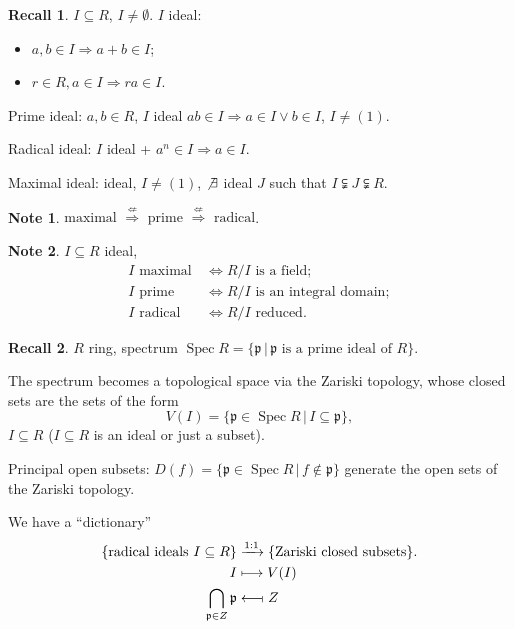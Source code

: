 \documentclass[12pt]{article}
\DeclareMathOperator{\Spec}{Spec}
\theoremstyle{definition}
\newtheorem*{note}{Note}
\newtheorem*{recall}{Recall}
\begin{document}
\begin{recall}
$I\subseteq R$, $I\neq\emptyset$. $I$ ideal:
\begin{itemize}
\item $a,b\in I\Rightarrow a+b\in I$;
\item $r\in R,a\in I\Rightarrow ra\in I$.
\end{itemize}

Prime ideal: $a,b\in R$, $I$ ideal $ab\in I\Rightarrow a\in I\vee b\in I$, $I\neq(1)$.

Radical ideal: $I$ ideal + $a^n\in I\Rightarrow a\in I$.

Maximal ideal: ideal, $I\neq(1)$, $\not\exists$ ideal $J$ such that $I\subsetneqq J\subsetneqq R$.
\end{recall}

\begin{note}
$\text{maximal }\overset{\not\Leftarrow}{\Rightarrow}\text{ prime }\overset{\not\Leftarrow}{\Rightarrow}\text{ radical}$.
\end{note}

\begin{note}
$I\subseteq R$ ideal,
\begin{align*}
I\text{ maximal}\,&\Longleftrightarrow R/I\text{ is a field};\\
I\text{ prime}\,&\Longleftrightarrow R/I\text{ is an integral domain};\\
I\text{ radical}\,&\Longleftrightarrow R/I\text{ reduced}.
\end{align*}
\end{note}

\begin{recall}
$R$ ring, spectrum $\Spec R=\{\mathfrak{p}\,|\,\mathfrak{p}\text{ is a prime ideal of }R\}$.
\end{recall}

The spectrum becomes a topological space via the Zariski topology, whose closed sets are the sets of the form
\[V(I)=\{\mathfrak{p}\in\Spec R\,|\,I\subseteq\mathfrak{p}\},\]
$I\subseteq R$ ($I\subseteq R$ is an ideal or just a subset).

Principal open subsets: $D(f)=\{\mathfrak{p}\in\Spec R\,|\,f\notin\mathfrak{p}\}$ generate the open sets of the Zariski topology.

We have a ``dictionary''
\begin{align*}
\{\text{radical ideals }I\subseteq R\}&\xrightarrow{1:1}\{\text{Zariski closed subsets}\}.\\
I&\longmapsto V(I)\\
\bigcap_{\mathfrak{p}\in Z}\mathfrak{p}&\longleftarrow\!\shortmid Z
\end{align*}
\end{document}
